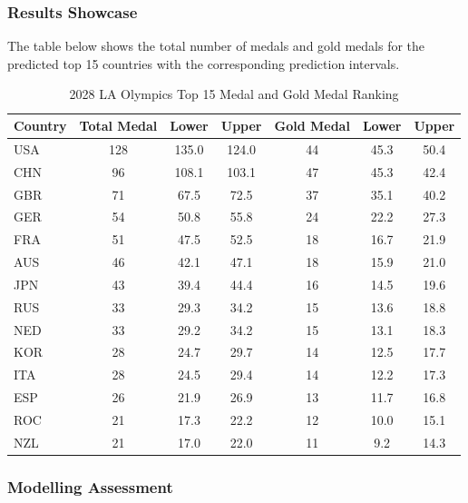 \documentclass{mcmthesis}
\begin{document}
\subsubsection{Results Showcase}
The table below shows the total number of medals and gold medals for the predicted top 15 countries with the corresponding prediction intervals.
\begin{table}[H]
	\centering
	\caption{2028 LA Olympics Top 15 Medal and Gold Medal Ranking}
	\label{tab:combined_medals}
	\begin{tabularx}{\textwidth}{l|ccc|ccc}
		\toprule
		\rowcolor{red!10}
		\textbf{Country} & \textbf{Total Medal} & \textbf{Lower} & \textbf{Upper} & \textbf{Gold Medal} & \textbf{Lower} & \textbf{Upper} \\
		\midrule
		\rowcolor{gray!10}
		USA & 128 & 135.0 & 124.0 & 44 & 45.3 & 50.4 \\
		CHN & 96 & 108.1 & 103.1 & 47 & 45.3 & 42.4 \\
		\rowcolor{gray!10}
		GBR & 71 & 67.5 & 72.5 & 37 & 35.1 & 40.2 \\
		GER & 54 & 50.8 & 55.8 & 24 & 22.2 & 27.3 \\
		\rowcolor{gray!10}
		FRA & 51 & 47.5 & 52.5 & 18 & 16.7 & 21.9 \\
		AUS & 46 & 42.1 & 47.1 & 18 & 15.9 & 21.0 \\
		\rowcolor{gray!10}
		JPN & 43 & 39.4 & 44.4 & 16 & 14.5 & 19.6 \\
		RUS & 33 & 29.3 & 34.2 & 15 & 13.6 & 18.8 \\
		\rowcolor{gray!10}
		NED & 33 & 29.2 & 34.2 & 15 & 13.1 & 18.3 \\
		KOR & 28 & 24.7 & 29.7 & 14 & 12.5 & 17.7 \\
		\rowcolor{gray!10}
		ITA & 28 & 24.5 & 29.4 & 14 & 12.2 & 17.3 \\
		ESP & 26 & 21.9 & 26.9 & 13 & 11.7 & 16.8 \\
		\rowcolor{gray!10}
		ROC & 21 & 17.3 & 22.2 & 12 & 10.0 & 15.1 \\
		NZL & 21 & 17.0 & 22.0 & 11 & 9.2 & 14.3 \\
		\bottomrule
	\end{tabularx}
\end{table}





\subsubsection{Modelling Assessment}
\end{document}
